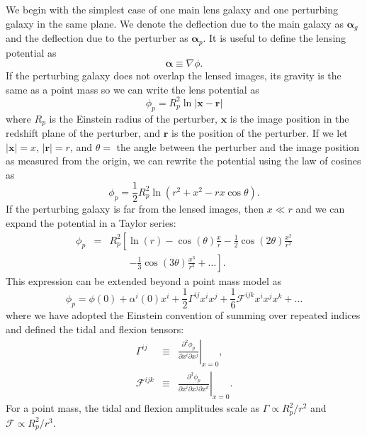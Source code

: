 \documentclass{emulateapj}
\newcommand\x[0]{\mathbf{x}}
\renewcommand\vec[1]{\mathbf{#1}}
\newcommand\al[0]{\boldsymbol{\alpha}}
\newcommand\sF{{\mathcal F}}
\begin{document}
We begin with the simplest case of one main lens galaxy and one perturbing galaxy in the same plane. We denote the deflection due to the main galaxy as $\al_{g}$ and the deflection due to the perturber as $\al_p$. It is useful to define the lensing potential as
\begin{equation}
\al \equiv \nabla \phi.
\end{equation}
If the perturbing galaxy does not overlap the lensed images, its gravity is the same as a point mass so we can write the lens potential as
\begin{equation}
\phi_p = R_p^2 \ln \left| \x - \vec{r} \right| 
\end{equation}
where $R_p$ is the Einstein radius of the perturber, $\x$ is the image position in the redshift plane of the perturber, and $\vec{r}$ is the position of the perturber. If we let $|\x| = x$, $|\vec{r}| = r$, and $\theta=$ the angle between the perturber and the image position as measured from the origin, we can rewrite the potential using the law of cosines as
\begin{equation}
\phi_p = \frac{1}{2}R_p^2 \ln(r^2 + x^2 - r x \cos\theta).
\end{equation}
If the perturbing galaxy is far from the lensed images, then $x \ll r$ and we can expand the potential in a Taylor series:
\begin{eqnarray}
\phi_p &=& R_p^2 \left[ \ln(r) - \cos(\theta) \frac{x}{r}  - \frac{1}{2} \cos(2\theta) \frac{x^2}{r^2} \right. \nonumber\\
&& \qquad\left. - \frac{1}{3}\cos(3\theta)\frac{x^3}{r^3}  + \ldots\right].
\end{eqnarray}
This expression can be extended beyond a point mass model as
\begin{equation}
\phi_p = \phi(0) + \alpha^i(0) x^i + \frac{1}{2}\Gamma^{ij} x^i x^j+ \frac{1}{6} \sF^{ijk} x^i x^j x^k + \ldots 
\end{equation}
where we have adopted the Einstein convention of summing over repeated indices and defined the tidal and flexion tensors:
\begin{eqnarray}
\Gamma^{ij} &\equiv& \left. \frac{\partial^2 \phi_p}{\partial x^i \partial x^j} \right|_{x=0} , \\
\sF^{ijk} &\equiv&  \left. \frac{\partial^3 \phi_p}{\partial x^i \partial x^j \partial x^k} \right|_{x=0} .
\end{eqnarray}
For a point mass, the tidal and flexion amplitudes scale as $\Gamma \propto R_p^2/r^2$ and $\sF \propto R_p^2/r^3$.
\end{document}
